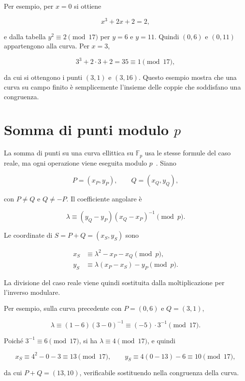 \documentclass[12pt,a4paper,oneside]{report}
\begin{document}
Per esempio, per \(x=0\) si ottiene

\[
x^3+2x+2=2,
\]

e dalla tabella \(y^2\equiv 2\pmod{17}\) per \(y=6\) e \(y=11\). Quindi \((0,6)\) e \((0,11)\) appartengono alla curva. Per \(x=3\),

\[
3^3+2\cdot 3+2=35\equiv 1\pmod{17},
\]

da cui si ottengono i punti \((3,1)\) e \((3,16)\). Questo esempio mostra che una curva su campo finito è semplicemente l'insieme delle coppie che soddisfano una congruenza.

\section{Somma di punti modulo \texorpdfstring{\(p\)}{p}}

La somma di punti su una curva ellittica su \(\mathbb{F}_p\) usa le stesse formule del caso reale, ma ogni operazione viene eseguita modulo \(p\)~\cite{margara_ec,sec1}. Siano

\[
P=(x_P,y_P), \qquad Q=(x_Q,y_Q),
\]

con \(P\neq Q\) e \(Q\neq -P\). Il coefficiente angolare è

\begin{equation}
    \lambda \equiv (y_Q-y_P)(x_Q-x_P)^{-1}\pmod p.
    \label{eq:lambda-add-fp}
\end{equation}

Le coordinate di \(S=P+Q=(x_S,y_S)\) sono

\begin{align}
    x_S &\equiv \lambda^2-x_P-x_Q \pmod p, \label{eq:add-x-fp}\\
    y_S &\equiv \lambda(x_P-x_S)-y_P \pmod p. \label{eq:add-y-fp}
\end{align}

La divisione del caso reale viene quindi sostituita dalla moltiplicazione per l'inverso modulare.

Per esempio, sulla curva precedente con \(P=(0,6)\) e \(Q=(3,1)\),

\[
\lambda \equiv (1-6)(3-0)^{-1}\equiv (-5)\cdot 3^{-1}\pmod{17}.
\]

Poiché \(3^{-1}\equiv 6\pmod{17}\), si ha \(\lambda\equiv 4\pmod{17}\), e quindi

\[
x_S\equiv 4^2-0-3\equiv 13\pmod{17},\qquad
y_S\equiv 4(0-13)-6\equiv 10\pmod{17},
\]

da cui \(P+Q=(13,10)\), verificabile sostituendo nella congruenza della curva.
\end{document}
